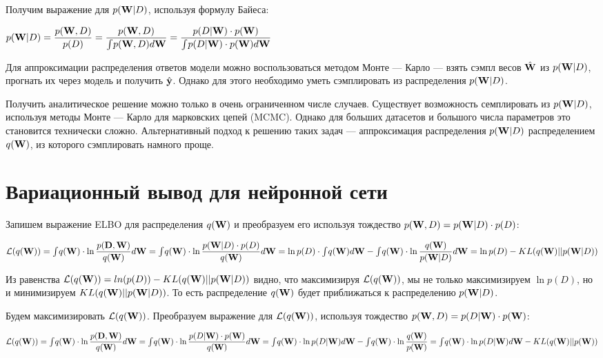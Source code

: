 \documentclass{article}
\begin{document}
Получим выражение для $p(\bold{W}| D)$, используя формулу Байеса:

$p(\bold{W}| D) =
\dfrac{p(\bold{W}, D)}{p(D)} =
\dfrac{p(\bold{W}, D)}{\int_{}{} p(\bold{W}, D) d\bold{W}} =
\dfrac{p(D | \bold{W}) \cdot p(\bold{W})}{\int_{}{} p(D | \bold{W}) \cdot p(\bold{W}) d\bold{W}} $

Для аппроксимации распределения ответов модели можно воспользоваться методом Монте — Карло — взять сэмпл весов $\hat{\bold{W}}$ из $p(\bold{W}| D)$, прогнать их через модель и получить $\hat{\bold{y}}$. Однако для этого необходимо уметь сэмплировать из распределения $p(\bold{W}| D)$.

Получить аналитическое решение можно только в очень ограниченном числе случаев. Существует возможность семплировать из $p(\bold{W}| D)$, используя методы Монте — Карло для марковских цепей (MCMC). Однако для больших датасетов и большого числа параметров это становится технически сложно. Альтернативный подход к решению таких задач — аппроксимация распределения $p(\bold{W}| D)$ распределением $q(\bold{W})$, из которого сэмплировать намного проще.


\section{Вариационный вывод для нейронной сети}
Запишем выражение ELBO для распределения $q(\bold{W})$ и преобразуем его используя тождество $p(\bold{W}, D) = p(\bold{W}| D)\cdot p(D)$:

$
\mathcal{L}(q(\bold{W})) =
\int_{}{} q(\bold{W}) \cdot \ln{\dfrac{p(\bold{D}, \bold{W})}{q(\bold{W})}} d\bold{W} =
\int_{}{} q(\bold{W}) \cdot \ln{\dfrac{p(\bold{W}| D) \cdot p(D)}{q(\bold{W})}} d\bold{W} = 
\ln{p(D)} \cdot \int_{}{} q(\bold{W}) d\bold{W} - \int_{}{} q(\bold{W})\cdot \ln{\dfrac{q(\bold{W})}{p(\bold{W}| D)}} d\bold{W} =
\ln{p(D)} - KL(q(\bold{W}) || p(\bold{W}| D))
$

Из равенства $\mathcal{L}(q(\bold{W})) = ln(p(D)) - KL(q(\bold{W}) || p(\bold{W}| D))$ видно, что максимизируя $\mathcal{L}(q(\bold{W}))$, мы не только максимизируем $\ln {p(D)}$, но и минимизируем $KL(q(\bold{W}) || p(\bold{W}| D))$. То есть распределение $q(\bold{W})$ будет приближаться к распределению $p(\bold{W}| D)$.

Будем максимизировать $\mathcal{L}(q(\bold{W}))$. Преобразуем выражение для $\mathcal{L}(q(\bold{W}))$, используя тождество
$p(\bold{W}, D) = p(D | \bold{W}) \cdot p(\bold{W})$:

$
\mathcal{L}(q(\bold{W})) =
\int_{}{} q(\bold{W}) \cdot \ln{\dfrac{p(\bold{D}, \bold{W})}{q(\bold{W})}} d\bold{W} =
\int_{}{} q(\bold{W}) \cdot \ln{\dfrac{p(D | \bold{W}) \cdot p(\bold{W})}{q(\bold{W})}} d\bold{W} = 
\int_{}{} q(\bold{W}) \cdot \ln{p(D | \bold{W})} d\bold{W} - \int_{}{} q(\bold{W}) \cdot \ln{\dfrac{q(\bold{W})}{p(\bold{W})}} = 
\int_{}{} q(\bold{W}) \cdot \ln{p(D | \bold{W})} d\bold{W} - KL(q(\bold{W}) || p(\bold{W}))
$
\end{document}
